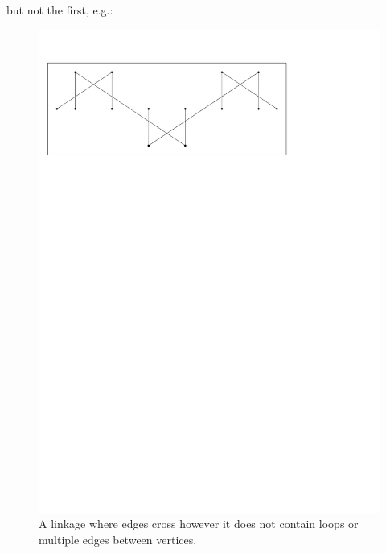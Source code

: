 but not the first, e.g.:
\begin{figure}[h]
\begin{center}
\includegraphics[scale=1]{graphics/crossingEdgeLinkage.pdf}
\end{center} 
\caption{A linkage where edges cross however it does not contain loops or multiple edges between 
vertices.}
\label{fig:linkage-3}
\end{figure}
